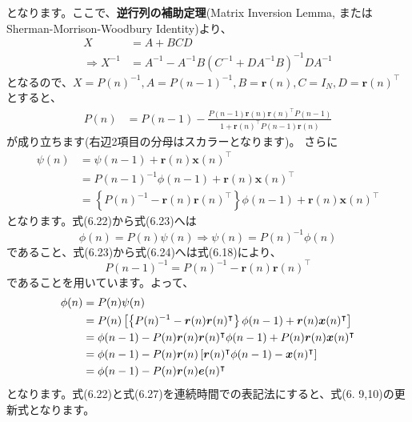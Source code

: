 となります。ここで、\textbf{逆行列の補助定理}(Matrix Inversion Lemma, またはSherman-Morrison-Woodbury Identity)より、
\begin{align}
X&=A+BCD\\
\Rightarrow X^{-1}&=A^{-1} - A^{-1}B(C^{-1}+DA^{-1}B)^{-1}DA^{-1}
\end{align}
となるので、$X={P}(n)^{-1}, A=P(n-1)^{-1}, B= \boldsymbol{r}(n), C=I_{N}, D=\boldsymbol{r}(n)^\intercal$とすると、
\begin{align}
P(n)&=P(n-1)-\frac{P(n-1) \boldsymbol{r}(n) \boldsymbol{r}(n)^\intercal P(n-1)}{1+\boldsymbol{r}(n)^\intercal P(n-1) \boldsymbol{r}(n)} 
\end{align}
が成り立ちます(右辺2項目の分母はスカラーとなります)。
さらに
\begin{align}
\psi(n)&=\psi(n-1)+\boldsymbol{r}(n)\boldsymbol{x}(n)^\intercal\\
&=P(n-1)^{-1}\phi(n-1)+\boldsymbol{r}(n)\boldsymbol{x}(n)^\intercal\\
&=\left\{P(n)^{-1}-\boldsymbol{r}(n) \boldsymbol{r}(n)^\intercal\right\}\phi(n-1)+\boldsymbol{r}(n)\boldsymbol{x}(n)^\intercal
\end{align}
となります。式(6.22)から式(6.23)へは
\begin{equation}
\phi(n)=P(n)\psi(n) \Rightarrow \psi(n)=P(n)^{-1}\phi(n)
\end{equation}
であること、式(6.23)から式(6.24)へは式(6.18)により、
\begin{equation}
P(n-1)^{-1}=P(n)^{-1}-\boldsymbol{r}(n) \boldsymbol{r}(n)^\intercal
\end{equation}
であることを用いています。よって、
\begin{align}
\phi(n)&=P(n)\psi(n)\notag\\
&=P(n)\left[\left\{P(n)^{-1}-\boldsymbol{r}(n) \boldsymbol{r}(n)^\intercal\right\}\phi(n-1)+\boldsymbol{r}(n)\boldsymbol{x}(n)^\intercal\right]\notag\\
&=\phi(n-1)-P(n)\boldsymbol{r}(n)\boldsymbol{r}(n)^\intercal\phi(n-1)+P(n)\boldsymbol{r}(n)\boldsymbol{x}(n)^\intercal\notag\\
&=\phi(n-1)-P(n)\boldsymbol{r}(n)\left[\boldsymbol{r}(n)^\intercal\phi(n-1)-\boldsymbol{x}(n)^\intercal\right]\notag\\
&=\phi(n-1)-P(n)\boldsymbol{r}(n)\boldsymbol{e}(n)^\intercal
\end{align}
となります。式(6.22)と式(6.27)を連続時間での表記法にすると、式(6. 9,10)の更新式となります。

